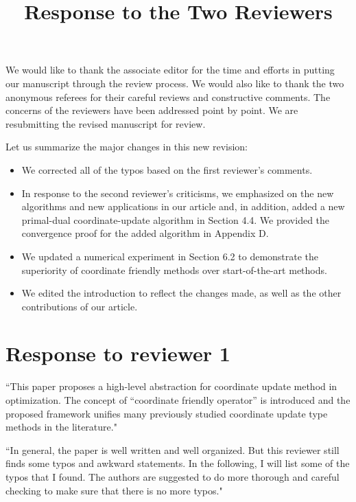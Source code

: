 \documentclass[amsa]{ipart}
\begin{document}
\title{Response to the Two Reviewers}
\vspace{5mm}

We would like to thank the associate editor for the time and efforts in putting our manuscript through the review process. We would also like to thank the two anonymous referees for their careful reviews and constructive comments. The concerns of the reviewers have been addressed point by point. We are resubmitting the revised manuscript for review.

Let us summarize the major changes in this new revision:
\begin{itemize}
\item We corrected all of the typos based on the first reviewer's comments.
\item In response to the second reviewer's criticisms, we emphasized on the new algorithms and new applications  in our article and, in addition,  added a new primal-dual coordinate-update algorithm in Section 4.4. We provided the convergence proof for the added algorithm   in Appendix D.
\item We updated a  numerical experiment in Section 6.2 to demonstrate the superiority of coordinate friendly methods over start-of-the-art methods.
\item We edited the introduction to reflect the changes made, as well as the other contributions of our article.
\end{itemize}

\section{Response to reviewer 1}
``This paper proposes a high-level abstraction for coordinate update method in optimization. The concept of ``coordinate friendly operator'' is introduced and the proposed framework unifies many previously studied coordinate update type methods in the literature."

``In general, the paper is well written and well organized. But this reviewer still finds some typos and awkward statements. In the following, I will list some of the typos that I found. The authors are suggested to do more thorough and careful checking to make sure that there is no more typos."

\end{document}
